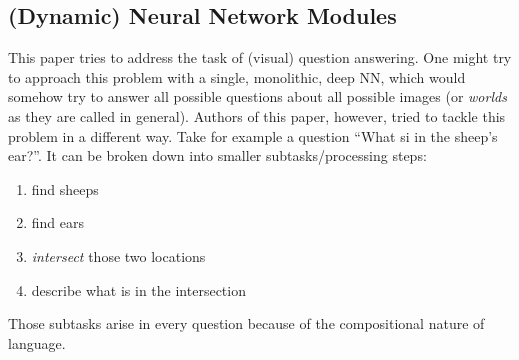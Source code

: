 \documentclass[a4paper]{article}
\begin{document}
\begin{multicols}{2}
\section*{(Dynamic) Neural Network Modules}

This paper tries to address the task of (visual) question answering. One might try to approach this problem with a single, monolithic, deep NN, which would somehow try to answer all possible questions about all possible images (or \textit{worlds} as they are called in general). Authors of this paper, however, tried to tackle this problem in a different way. Take for example a question ``What si in the sheep's ear?''. It can be broken down into smaller subtasks/processing steps:
\begin{enumerate}
    \item find sheeps
    \item find ears
    \item \textit{intersect} those two locations
    \item describe what is in the intersection
\end{enumerate}

Those subtasks arise in every question because of the compositional nature of language.


\end{multicols}
\end{document}
